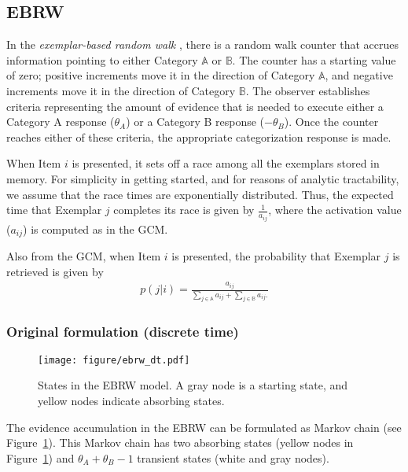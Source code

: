 \documentclass[doc]{apa6}
\begin{document}
\subsection{EBRW}

In the \emph{exemplar-based random walk} \parencite[EBRW\@;][]{Nosofsky1997a}, there is a random
walk counter that accrues information pointing to either Category $\mathbb{A}$ or $\mathbb{B}$.  The
counter has a starting value of zero; positive increments move it in the direction of Category
$\mathbb{A}$, and negative increments move it in the direction of Category $\mathbb{B}$. The
observer establishes criteria representing the amount of evidence that is needed to execute either a
Category A response ($\theta_{A}$) or a Category B response ($-\theta_{B}$). Once the counter
reaches either of these criteria, the appropriate categorization response is made.

When Item $i$ is presented, it sets off a race among all the exemplars stored in memory. For
simplicity in getting started, and for reasons of analytic tractability, we assume that the race
times are exponentially distributed. Thus, the expected time that Exemplar $j$ completes its race is
given by $\frac{1}{a_{ij}}$, where the activation value ($a_{ij}$) is computed as in the GCM\@.

Also from the GCM, when Item $i$ is presented, the probability that Exemplar $j$ is retrieved is
given by
\begin{align}
    p(j \vert i) = \frac{a_{ij}}
                        {\sum_{j \in \mathbb{A}} a_{ij} + \sum_{j \in \mathbb{B}} a_{ij}.}
\end{align}


\subsubsection{Original formulation (discrete time)}

\begin{figure}[t!]
    \centering
    \texttt{[image: figure/ebrw\_dt.pdf]}

    \vspace{10pt}

    \caption{States in the EBRW model. A gray node is a starting state, and yellow nodes indicate
    absorbing states.}

\label{fig:ebrw_dt}
\end{figure}

The evidence accumulation in the EBRW can be formulated as Markov chain (see
Figure~\ref{fig:ebrw_dt}). This Markov chain has two absorbing states (yellow nodes in
Figure~\ref{fig:ebrw_dt}) and $\theta_{A} + \theta_{B} - 1$ transient states (white and gray nodes).
\end{document}
